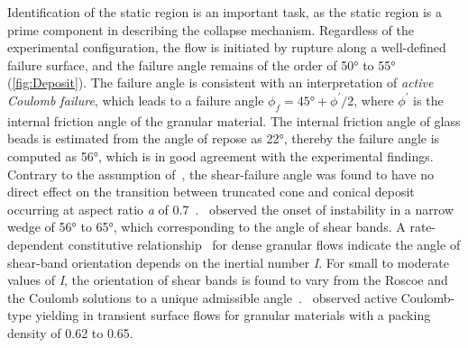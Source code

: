 Identification of the static region is an important task, as the static region 
is a prime component in describing the collapse mechanism. Regardless of the 
experimental configuration, the flow is initiated by rupture along a 
well-defined failure surface, and the failure angle remains of the order of 
50\si{\degree} to 55\si{\degree} (\cref{fig:Deposit}). The failure angle is 
consistent with an interpretation of \textit{active Coulomb failure}, which 
leads to a failure angle $\phi_{\textit{f}}=45\si{\degree} +\phi^\prime / 2$, 
where $\phi^\prime$ is the internal friction angle of the granular material. 
The internal friction angle of glass beads is estimated from the angle of 
repose as 22\si{\degree}, thereby the failure angle is 
computed as 56\si{\degree}, which is in good agreement with the experimental 
findings. Contrary to the assumption of~\citet{Lajeunesse2004}, the 
shear-failure 
angle was found to have no direct effect on the transition between truncated 
cone and conical deposit occurring at aspect ratio \textit{a} of 
0.7~\citep{Lajeunesse2005}.~\citet{Schaeffer1990} observed the onset of 
instability in a narrow wedge of 56\si{\degree} to 
65\si{\degree}, which corresponding to the angle of shear bands. A 
rate-dependent constitutive relationship~\citep{Jop2006} for dense granular 
flows indicate the angle of shear-band orientation depends on the inertial 
number \textit{I}. For small to moderate values of \textit{I}, the orientation 
of shear bands is found to vary from the Roscoe and the Coulomb solutions to a 
unique admissible angle~\citep{Lemiale2011}.~\citet{Daerr1999} observed active 
Coulomb-type yielding in transient surface flows for granular materials with 
a packing density of 0.62 to 0.65. 

\clearpage


